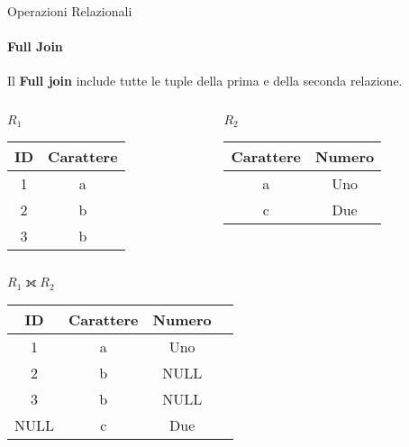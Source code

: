     \begin{frame}{Operazioni Relazionali}
        \framesubtitle{Full Join}
        Il \textbf{Full join} include tutte le tuple della prima e della seconda relazione.
        \begin{columns}
            \begin{column}{0.48\textwidth}
                \centering
                {\small $R_1$}
                \newline
        \begin{tabular}{|c|c|}
            \hline
            \rowcolor{cyan!30}ID & Carattere \\
            \hline
            1 & a \\ \hline
            2 & \cellcolor{red}b \\ \hline
            3 & \cellcolor{red}b \\ \hline
            \end{tabular}
            \end{column}
            \begin{column}{0.48\textwidth}
                \centering
                {\small $R_2$}
                \newline
                \begin{tabular}{|c|c|}
                    \hline
                    \rowcolor{cyan!30} Carattere & Numero \\ \hline
                    a & Uno \\ \hline
                    \cellcolor{red}c & Due \\ \hline
                    \end{tabular}
            \end{column}
        \end{columns}
        \vspace{.5cm}
        \centering
        \pause
        {\small $R_1 \fullouterjoin R_2$}
        \begin{tabular}{|c|c|c|c|}
            \hline
            \rowcolor{cyan!30} ID & Carattere & Numero \\ \hline
            1 & a & Uno \\ \hline
            \rowcolor{red}2 & b & NULL \\ \hline
            \rowcolor{red}3 & b & NULL \\ \hline
            \rowcolor{red}NULL & c & Due \\ \hline
            \end{tabular}
    \end{frame}
